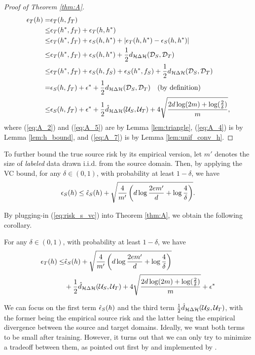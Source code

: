 \begin{proof}[Proof of Theorem \ref{thm:A}]
  \begin{align}
     \epsilon_{T}(h) 
    =& \epsilon_{T}(h, f_T) \label{eq:A_1}\\
    \leq& \epsilon_{T}(h^*, f_T) + \epsilon_{T}(h, h^*) \label{eq:A_2}\\
    \leq& \epsilon_{T}(h^*, f_T) + \epsilon_{S}(h, h^*) + \left \lvert \epsilon_{T}(h, h^*) - \epsilon_{S}(h, h^*) \right \rvert \label{eq:A_3}\\
    \leq& \epsilon_{T}(h^*, f_T) + \epsilon_{S}(h, h^*) + \frac{1}{2} d_{\mathcal{H} \Delta \mathcal{H}}(\mathcal{D}_S, \mathcal{D}_T) \label{eq:A_4}\\
    \leq& \epsilon_{T}(h^*, f_T) + \epsilon_{S}(h, f_S) + \epsilon_{S}(h^*, f_S) + \frac{1}{2} d_{\mathcal{H} \Delta \mathcal{H}}(\mathcal{D}_S, \mathcal{D}_T) \label{eq:A_5}\\
    =   & \epsilon_{S}(h, f_T) + \epsilon^* + \frac{1}{2} d_{\mathcal{H} \Delta \mathcal{H}}(\mathcal{D}_S, \mathcal{D}_T) \text{\quad (by definition)} \label{eq:A_6}\\
    \leq& \epsilon_{S}(h, f_T) + \epsilon^* + \frac{1}{2} \hat{d}_{\mathcal{H} \Delta \mathcal{H}}(\mathcal{U}_S, \mathcal{U}_T)
          + 4 \sqrt{\frac{2d \log(2m) + \log(\frac{2}{\delta})}{m}}, \label{eq:A_7}
  \end{align}
  where (\ref{eq:A_2}) and (\ref{eq:A_5}) are by Lemma \ref{lem:triangle}, (\ref{eq:A_4}) is by Lemma \ref{lem:h_bound}, and (\ref{eq:A_7}) is by Lemma \ref{lem:unif_conv_h}.
\end{proof}

To further bound the true source risk by its empirical version, let $m'$ denotes the size of \textit{labeled} data drawn i.i.d. from the source domain. Then, by applying the VC bound, for any $\delta \in (0,1)$, with probability at least $1 - \delta$, we have
\begin{equation}\label{eq:risk_s_vc}
  \epsilon_{S}(h) \leq \hat{\epsilon}_{S}(h) + \sqrt{\frac{4}{m'}\left( d \log \frac{2em'}{d} + \log \frac{4}{\delta} \right)}.
\end{equation}

By plugging-in (\ref{eq:risk_s_vc}) into Theorem \ref{thm:A}, we obtain the following corollary.

\begin{corollary}\label{thm:B}
  For any $\delta \in (0,1)$, with probability at least $1 - \delta$, we have
  \begin{equation}\label{eq:B}
    \begin{aligned}
      \epsilon_{T}(h) \leq&
      \hat{\epsilon}_{S}(h) + \sqrt{\frac{4}{m'}\left( d \log \frac{2em'}{d} + \log \frac{4}{\delta} \right)} \\
      & + \frac{1}{2} \hat{d}_{\mathcal{H} \Delta \mathcal{H}}(\mathcal{U}_S, \mathcal{U}_T)
      + 4 \sqrt{\frac{2d \log(2m) + \log(\frac{2}{\delta})}{m}} 
      + \epsilon^*
    \end{aligned}
  \end{equation}
\end{corollary}

We can focus on the first term $\hat{\epsilon}_{S}(h)$ and the third term $\frac{1}{2} \hat{d}_{\mathcal{H} \Delta \mathcal{H}}(\mathcal{U}_S, \mathcal{U}_T)$, with the former being the empirical source risk and the latter being the empirical divergence between the source and target domains. Ideally, we want both terms to be small after training. However, it turns out that we can only try to minimize a tradeoff between them, as pointed out first by \cite{BenDavid2006} and implemented by \cite{Ganin2016}.
